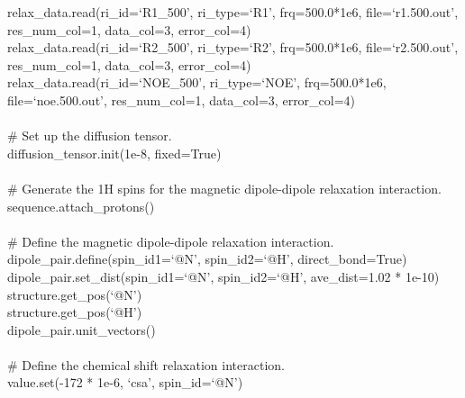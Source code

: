 \begin{htmlonly}
\begin{htmlonly}
\begin{exampleenv}
\hspace*{4ex} relax\_data.read(ri\_id=`R1\_500',  ri\_type=`R1',  frq=500.0*1e6, file=`r1.500.out', res\_num\_col=1, data\_col=3, error\_col=4) \\
\hspace*{4ex} relax\_data.read(ri\_id=`R2\_500',  ri\_type=`R2',  frq=500.0*1e6, file=`r2.500.out', res\_num\_col=1, data\_col=3, error\_col=4) \\
\hspace*{4ex} relax\_data.read(ri\_id=`NOE\_500', ri\_type=`NOE', frq=500.0*1e6, file=`noe.500.out', res\_num\_col=1, data\_col=3, error\_col=4) \\
 \\
\hspace*{4ex} \# Set up the diffusion tensor. \\
\hspace*{4ex} diffusion\_tensor.init(1e-8, fixed=True) \\
 \\
\hspace*{4ex} \# Generate the 1H spins for the magnetic dipole-dipole relaxation interaction. \\
\hspace*{4ex} sequence.attach\_protons() \\
 \\
\hspace*{4ex} \# Define the magnetic dipole-dipole relaxation interaction. \\
\hspace*{4ex} dipole\_pair.define(spin\_id1=`@N', spin\_id2=`@H', direct\_bond=True) \\
\hspace*{4ex} dipole\_pair.set\_dist(spin\_id1=`@N', spin\_id2=`@H', ave\_dist=1.02 * 1e-10) \\
\hspace*{4ex} structure.get\_pos(`@N') \\
\hspace*{4ex} structure.get\_pos(`@H') \\
\hspace*{4ex} dipole\_pair.unit\_vectors() \\
 \\
\hspace*{4ex} \# Define the chemical shift relaxation interaction. \\
\hspace*{4ex} value.set(-172 * 1e-6, `csa', spin\_id=`@N') \\
 \\

\end{exampleenv}
\end{htmlonly}
\end{htmlonly}
